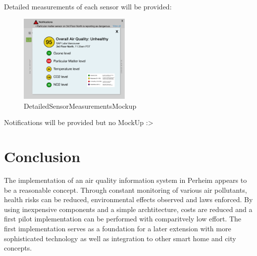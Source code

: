 \documentclass[conference]{IEEEtran}
\begin{document}
Detailed measurements of each sensor will be provided:
\begin{figure}[htbp]
	\centering
	\includegraphics[width=0.48\textwidth]{DetailedSensorMeasurementsMockup.png}
	\caption{DetailedSensorMeasurementsMockup}
	\label{fig:credentialsFlow}
\end{figure}

Notifications will be provided but no MockUp :>

\section{Conclusion}
The implementation of an air quality information system in Perheim appears to be a reasonable concept. Through constant monitoring of various air pollutants, health risks can be reduced, environmental effects observed and laws enforced. By using inexpensive components and a simple archtitecture, costs are reduced and a first pilot implementation can be performed with comparitvely low effort. The first implementation serves as a foundation for a later extension with more sophisticated technology as well as integration to other smart home and city concepts. 










%
%
%









\end{document}

